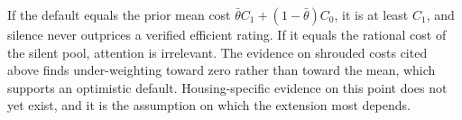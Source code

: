 If the default equals the prior mean cost $\bar\theta C_1+(1-\bar\theta)C_0$, it is at least $C_1$, and silence never outprices a verified efficient rating. If it equals the rational cost of the silent pool, attention is irrelevant. The evidence on shrouded costs cited above finds under-weighting toward zero rather than toward the mean, which supports an optimistic default. Housing-specific evidence on this point does not yet exist, and it is the assumption on which the extension most depends.
